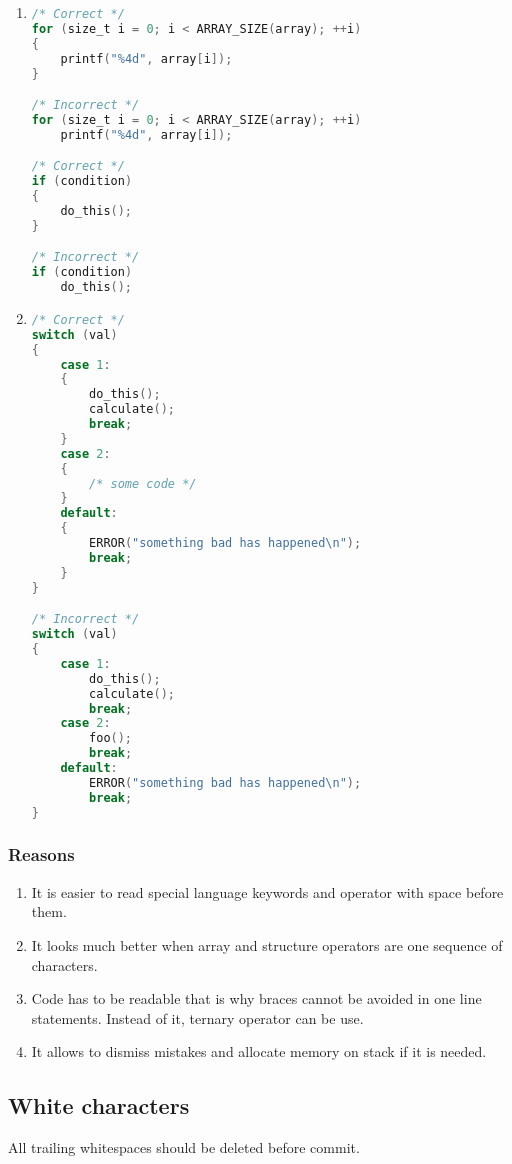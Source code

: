 \begin{enumerate}
    \item 
\begin{lstlisting}[language=C,style=C99]
/* Correct */
for (size_t i = 0; i < ARRAY_SIZE(array); ++i)
{
    printf("%4d", array[i]);
}

/* Incorrect */
for (size_t i = 0; i < ARRAY_SIZE(array); ++i)
    printf("%4d", array[i]);

/* Correct */
if (condition)
{
    do_this();
}

/* Incorrect */
if (condition)
    do_this();
\end{lstlisting}      

    \item 
\begin{lstlisting}[language=C,style=C99]
/* Correct */
switch (val)
{
    case 1:
    {
        do_this();
        calculate();
        break;
    }
    case 2:
    {
        /* some code */
    }
    default:
    {
        ERROR("something bad has happened\n");
        break;
    }
}

/* Incorrect */
switch (val)
{
    case 1:
        do_this();
        calculate();
        break;
    case 2:
        foo();
        break;
    default:
        ERROR("something bad has happened\n");
        break;
}
\end{lstlisting} 

\end{enumerate}

\subsubsection{Reasons}
\begin{enumerate}
    \item It is easier to read special language keywords and operator with space before them.
    \item It looks much better when array and structure operators are one sequence of characters.
    \item Code has to be readable that is why braces cannot be avoided in one line statements. Instead of it, ternary operator can be use.
    \item It allows to dismiss mistakes and allocate memory on stack if it is needed.
\end{enumerate}

\subsection{White characters}
All trailing whitespaces should be deleted before commit.

